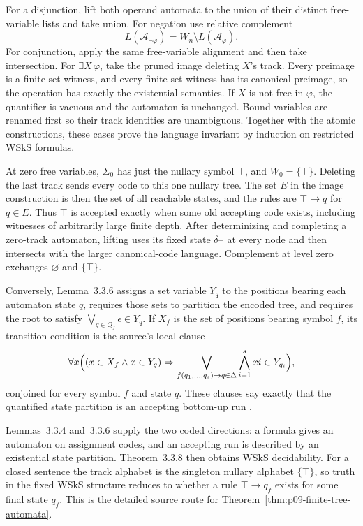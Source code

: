 For a disjunction, lift both operand automata to the union of their
distinct free-variable lists and take union.
For negation use relative complement
\[
 L(\mathcal A_{\neg\varphi})=W_n\setminus L(\mathcal A_\varphi).
\]
For conjunction, apply the same free-variable alignment and then
take intersection.
For \(\exists X\,\varphi\), take the pruned image deleting \(X\)'s
track.  Every preimage is a finite-set witness, and every finite-set
witness has its canonical preimage, so the operation has exactly
the existential semantics.  If \(X\) is not free in \(\varphi\),
the quantifier is vacuous and the automaton is unchanged.
Bound variables are renamed first so their track identities are unambiguous.
Together with the atomic constructions, these cases prove the
language invariant by induction on restricted WSkS formulas.

At zero free variables, \(\Sigma_0\) has just the nullary symbol
\(\top\), and \(W_0=\{\top\}\).
Deleting the last track sends every code to this one nullary tree.
The set \(E\) in the image construction is then the set of all
reachable states, and the rules are \(\top\to q\) for \(q\in E\).
Thus \(\top\) is accepted exactly when some old accepting code exists,
including witnesses of arbitrarily large finite depth.
After determinizing and completing a zero-track automaton, lifting
uses its fixed state \(\delta_\top\) at every node and then intersects
with the larger canonical-code language.
Complement at level zero exchanges \(\varnothing\) and \(\{\top\}\).

Conversely, Lemma~3.3.6 assigns a set variable \(Y_q\) to the positions bearing
each automaton state \(q\), requires those sets to partition the encoded tree,
and requires the root to satisfy
\(\bigvee_{q\in Q_f}\epsilon\in Y_q\).  If \(X_f\) is the set of positions
bearing symbol \(f\), its transition condition is the source's local clause
\[
 \forall x\Bigl((x\in X_f\land x\in Y_q)\Rightarrow
   \bigvee_{f(q_1,\ldots,q_s)\to q\in\Delta}
      \bigwedge_{i=1}^{s}xi\in Y_{q_i}\Bigr),
\]
conjoined for every symbol \(f\) and state \(q\).  These clauses say exactly
that the quantified state partition is an accepting bottom-up run
\cite[\S3.3]{ComonEtAl2007}.

Lemmas~3.3.4 and~3.3.6 supply the two coded directions: a formula
gives an automaton on assignment codes, and an accepting run is
described by an existential state partition.
Theorem~3.3.8 then obtains WSkS decidability.  For a
closed sentence the track alphabet is the singleton nullary alphabet
\(\{\top\}\), so truth in the fixed WSkS structure reduces to
whether a rule \(\top\to q_f\) exists for some final state \(q_f\).  This is
the detailed source route for Theorem~\ref{thm:p09-finite-tree-automata}.

